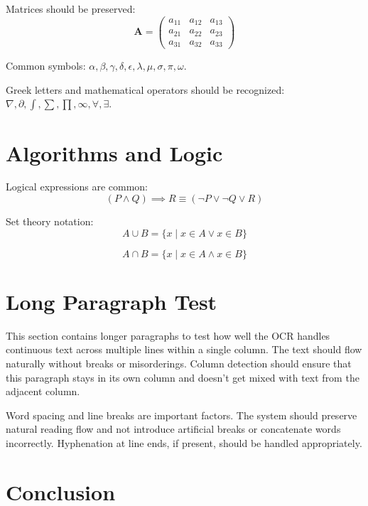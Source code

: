 \documentclass[10pt,twocolumn]{article}
\begin{document}
Matrices should be preserved:
\begin{equation}
\mathbf{A} = \begin{pmatrix}
a_{11} & a_{12} & a_{13} \\
a_{21} & a_{22} & a_{23} \\
a_{31} & a_{32} & a_{33}
\end{pmatrix}
\end{equation}

Common symbols: $\alpha, \beta, \gamma, \delta, \epsilon, \lambda, \mu, \sigma, \pi, \omega$. 

Greek letters and mathematical operators should be recognized: $\nabla, \partial, \int, \sum, \prod, \infty, \forall, \exists$.

\section{Algorithms and Logic}

Logical expressions are common:
\begin{equation}
(P \land Q) \implies R \equiv (\neg P \lor \neg Q \lor R)
\end{equation}

Set theory notation:
\begin{equation}
A \cup B = \{x \mid x \in A \lor x \in B\}
\end{equation}

\begin{equation}
A \cap B = \{x \mid x \in A \land x \in B\}
\end{equation}

\section{Long Paragraph Test}

This section contains longer paragraphs to test how well the OCR handles continuous text across multiple lines within a single column. The text should flow naturally without breaks or misorderings. Column detection should ensure that this paragraph stays in its own column and doesn't get mixed with text from the adjacent column. 

Word spacing and line breaks are important factors. The system should preserve natural reading flow and not introduce artificial breaks or concatenate words incorrectly. Hyphenation at line ends, if present, should be handled appropriately.

\section{Conclusion}
\end{document}
